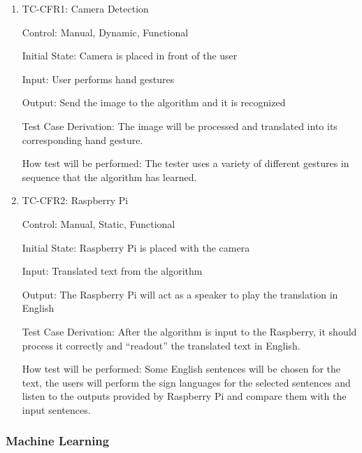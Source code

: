 \documentclass[12pt]{article}
\begin{document}
\begin{enumerate}
  
\item{TC-CFR1: Camera Detection\\}
  
Control: Manual, Dynamic, Functional
            
Initial State: Camera is placed in front of the user
            
Input: User performs hand gestures
            
Output: Send the image to the algorithm and it is recognized
  
Test Case Derivation: The image will be processed and translated into its corresponding hand gesture.
            
How test will be performed: The tester uses a variety of different gestures in sequence that the algorithm has learned.

\item{TC-CFR2: Raspberry Pi\\}
  
Control: Manual, Static, Functional
            
Initial State: Raspberry Pi is placed with the camera
            
Input: Translated text from the algorithm
            
Output: The Raspberry Pi will act as a speaker to play the translation in English
  
Test Case Derivation: After the algorithm is input to the Raspberry, it should process it correctly and “readout” the translated text in English.
            
How test will be performed: Some English sentences will be chosen for the text, the users will perform the sign languages for the selected sentences and listen to the outputs provided by Raspberry Pi and compare them with the input sentences.
 
\end{enumerate}
  
\subsubsection{Machine Learning}
  
\end{document}
